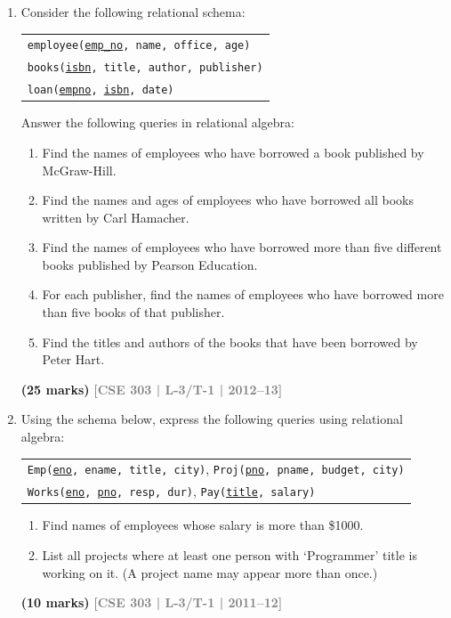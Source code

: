\documentclass[12pt]{article}
\newcommand{\yr}[1]{\hfill\textcolor{gray}{\small\textbf{[#1]}}}
\newcommand{\mk}[1]{\textcolor{orange!70!black}{\small\textbf{(#1 marks)}}}
\begin{document}
\begin{enumerate}
\item Consider the following relational schema:
\begin{center}
\begin{tabular}{l}
\texttt{employee(\underline{emp\_no}, name, office, age)}\\
\texttt{books(\underline{isbn}, title, author, publisher)}\\
\texttt{loan(\underline{empno}, \underline{isbn}, date)}
\end{tabular}
\end{center}
Answer the following queries in relational algebra:
\begin{enumerate}
  \item Find the names of employees who have borrowed a book published by McGraw-Hill.
  \item Find the names and ages of employees who have borrowed all books written by Carl Hamacher.
  \item Find the names of employees who have borrowed more than five different books published by Pearson Education.
  \item For each publisher, find the names of employees who have borrowed more than five books of that publisher.
  \item Find the titles and authors of the books that have been borrowed by Peter Hart.
\end{enumerate}
\mk{25} \yr{CSE 303 | L-3/T-1 | 2012--13}


\item Using the schema below, express the following queries using relational algebra:
\begin{center}
\begin{tabular}{l}
\texttt{Emp(\underline{eno}, ename, title, city)},\quad
\texttt{Proj(\underline{pno}, pname, budget, city)}\\
\texttt{Works(\underline{eno}, \underline{pno}, resp, dur)},\quad
\texttt{Pay(\underline{title}, salary)}
\end{tabular}
\end{center}
\begin{enumerate}
  \item Find names of employees whose salary is more than \$1000.
  \item List all projects where at least one person with `Programmer' title is working on it. (A project name may appear more than once.)
\end{enumerate}
\mk{10} \yr{CSE 303 | L-3/T-1 | 2011--12}



\end{enumerate}
\end{document}
